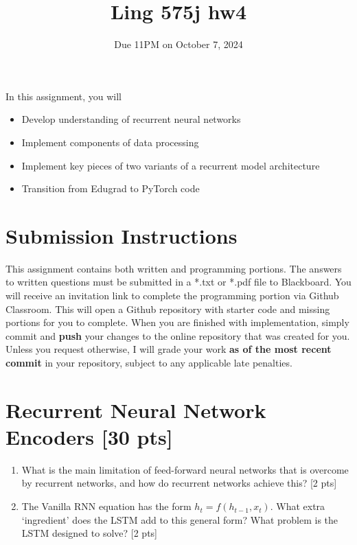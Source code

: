 \documentclass[11pt]{article}
\begin{document}
\title{Ling 575j hw4}
\date{\vspace{-0.2in}Due 11PM on October 7, 2024}
\maketitle


\noindent In this assignment, you will 
\begin{itemize}
  \item Develop understanding of recurrent neural networks
  \item Implement components of data processing 
  \item Implement key pieces of two variants of a recurrent model architecture
  \item Transition from Edugrad to PyTorch code
\end{itemize}

\section*{Submission Instructions}
This assignment contains both written and programming portions. The answers to written questions must be submitted in a *.txt or *.pdf file to Blackboard. You will receive an invitation link to complete the programming portion via Github Classroom. This will open a Github repository with starter code and missing portions for you to complete. When you are finished with implementation, simply commit and \textbf{push} your changes to the online repository that was created for you. Unless you request otherwise, I will grade your work \textbf{as of the most recent commit} in your repository, subject to any applicable late penalties.


\section{Recurrent Neural Network Encoders [30 pts]}

\begin{enumerate}[label=\alph*.]
  \item What is the main limitation of feed-forward neural networks that is overcome by recurrent networks, and how do recurrent networks achieve this? [2 pts]
  \item The Vanilla RNN equation has the form $h_t = f(h_{t-1}, x_t)$.  What extra `ingredient' does the LSTM add to this general form?  What problem is the LSTM designed to solve? [2 pts]
\end{enumerate}
\end{document}
